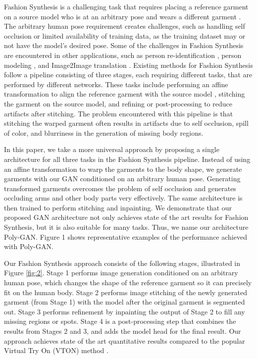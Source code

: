 \documentclass[11pt]{article}
\begin{document}
Fashion Synthesis is a challenging task that requires placing a reference garment on a source model who is at an arbitrary pose and wears a different garment \citet{VITON} \citet{CP-VTON} \citet{MG-VTON} \citet{ClothingGAN} \citet{FashionGAN2}. The arbitrary human pose requirement creates challenges, such as handling self occlusion or limited availability of training data, as the training dataset may or not have the model's desired pose. Some of the challenges in Fashion Synthesis are encountered in other applications, such as person re-identification \citet{SoftGAN}, person modeling  \citet{P-rid}, and Image2Image translation \citet{CanalogyGAN}. 
Existing methods for Fashion Synthesis follow a pipeline consisting of three stages, each requiring different tasks, that are performed by different networks.  These tasks include performing an affine transformation to align the reference garment with the source model \citet{GMM}, stitching the garment on the source model, and refining or post-processing to reduce artifacts after stitching. The problem encountered with this pipeline is that stitching the warped garment often results in artifacts due to self occlusion, spill of color, and blurriness in the generation of missing body regions.

In this paper, we take a more universal approach by proposing a single architecture for all three tasks in the Fashion Synthesis pipeline.  
Instead of using an affine transformation to warp the garments to the body shape, we generate garments with our GAN conditioned on an arbitrary human pose. Generating transformed garments overcomes the problem of self occlusion and  generates occluding arms and other body parts very effectively. The same architecture is then trained to perform stitching and inpainting.  
We demonstrate that our proposed GAN architecture not only achieves state of the art results for Fashion Synthesis, but it is also suitable for many tasks. Thus, we name our architecture Poly-GAN. 
Figure 1  shows representative examples of the performance achieved with Poly-GAN.



Our Fashion Synthesis approach consists of the following stages, illustrated in Figure \ref{fig:2}. 
Stage 1 performs image generation conditioned on an arbitrary human pose, which  changes the shape of the reference garment so it can precisely fit on the human body. 
Stage 2 performs image stitching of the newly generated garment (from Stage 1) with the model after the original garment is segmented out. 
Stage 3 performs refinement by inpainting the output of Stage 2 to fill any missing regions or spots. Stage 4 is a post-processing step that combines the results from Stages 2 and 3, and adds the model head for the final result. Our approach achieves state of the art quantitative results compared to the popular Virtual Try On (VTON) method \citet{CP-VTON}.
\end{document}
